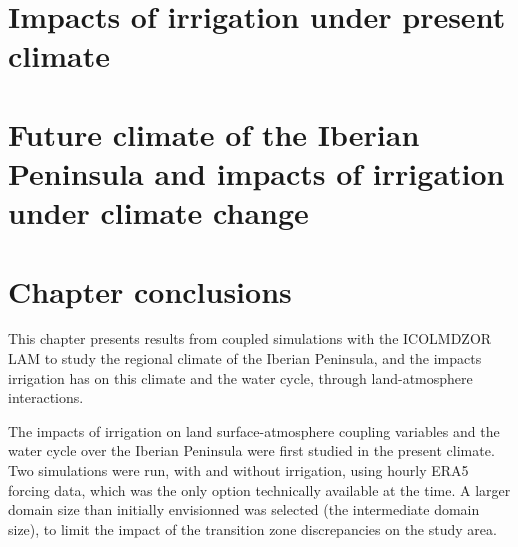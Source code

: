 
\clearpage

\section{Impacts of irrigation under present climate}
\label{sec:article1}

\clearpage

\section{Future climate of the Iberian Peninsula and impacts of irrigation under climate change}
\label{sec:climate_change}

\clearpage

\section{Chapter conclusions}

This chapter presents results from coupled simulations with the ICOLMDZOR LAM to study the regional climate of the Iberian Peninsula, and the impacts irrigation has on this climate and the water cycle, through land-atmosphere interactions. 

\hfill

The impacts of irrigation on land surface-atmosphere coupling variables and the water cycle over the Iberian Peninsula were first studied in the present climate. Two simulations were run, with and without irrigation, using hourly ERA5 forcing data, which was the only option technically available at the time. A larger domain size than initially envisionned was selected (the intermediate domain size), to limit the impact of the transition zone discrepancies on the study area.

